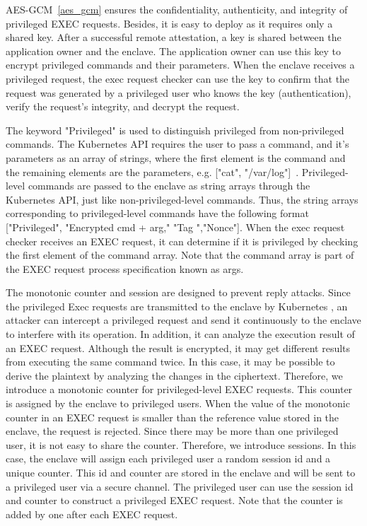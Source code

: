 AES-GCM~\ref{aes_gcm} ensures the confidentiality, authenticity, and integrity of privileged EXEC requests. Besides, it is easy to deploy as it requires only a shared key. After a successful remote attestation, a key is shared between the application owner and 
the enclave. The application owner can use this key to encrypt privileged commands and their parameters. When the enclave receives a privileged request, the exec request checker can use the key to confirm that the request was generated by a 
privileged user who knows the key (authentication), verify the request's integrity, and decrypt the request.


The keyword "Privileged" is used to distinguish privileged from non-privileged commands. The Kubernetes API requires the user to pass a command, and it's parameters as an array of strings, where the first element is the command and the remaining elements 
are the parameters, e.g. ["cat", "/var/log"]~\cite*{k8s}. Privileged-level commands are passed to the enclave as string arrays through the Kubernetes  API, just like non-privileged-level commands. Thus, the string arrays corresponding to privileged-level commands have 
the following format ["Privileged", "Encrypted cmd + arg," "Tag ","Nonce"]. When the exec request checker receives an EXEC request, it can determine if it is privileged by checking the first element of the command array. Note that the command array 
is part of the EXEC request process specification known as args.


The  monotonic counter and session are designed to prevent reply attacks. Since the privileged Exec requests are transmitted to the enclave by Kubernetes , an attacker can intercept a privileged request and send it continuously to the enclave to 
interfere with its operation. In addition, it can analyze the execution result of an EXEC request. Although the result is encrypted, it may get different results from executing the same command twice. In this case, it may be possible to derive the 
plaintext by analyzing the changes in the ciphertext.   Therefore, we introduce a monotonic counter for privileged-level EXEC requests. This counter is assigned by the enclave to privileged users. When the value of the monotonic counter in an EXEC 
request is smaller than the reference value stored in the enclave, the request is rejected. Since there may be more than one privileged user, it is not easy to share the counter. Therefore, we introduce sessions. In this case, the enclave will 
assign each privileged user a random session id and a unique counter. This id and counter are stored in the enclave and will be sent to a privileged user via a secure channel. The privileged user can use the session id and counter to construct a 
privileged EXEC request. Note that the counter is added by one after each EXEC request.


